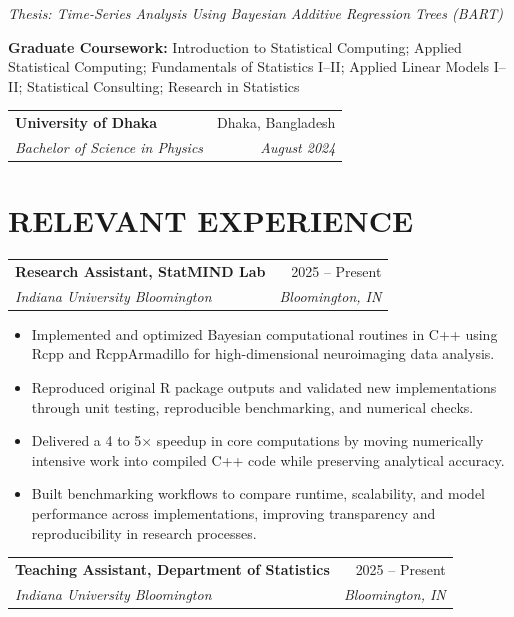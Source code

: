 \documentclass[10pt,letterpaper]{article}
\makeatletter
\newcommand{\resumeEntry}[4]{%
  \begin{tabularx}{\textwidth}{@{}Xr@{}}
    \textbf{#1} & #2 \\
    \textit{#3} & \textit{#4}
  \end{tabularx}%
}
\newenvironment{resumeItems}{%
  \begin{itemize}[
    label=\textbullet,
    leftmargin=14pt,
    labelsep=5pt,
    itemsep=0.5pt,
    topsep=1.0pt,
    parsep=0pt,
    partopsep=0pt
  ]
}{%
  \end{itemize}
}
\makeatother
\begin{document}
\textit{Thesis: Time-Series Analysis Using Bayesian Additive Regression Trees (BART)}

\vspace{0.5pt}

\textbf{Graduate Coursework:}
Introduction to Statistical Computing; Applied Statistical Computing;
Fundamentals of Statistics I--II; Applied Linear Models I--II;
Statistical Consulting; Research in Statistics

\vspace{2.2pt}

\resumeEntry
  {University of Dhaka}
  {Dhaka, Bangladesh}
  {Bachelor of Science in Physics}
  {August 2024}

\section*{RELEVANT EXPERIENCE}

\resumeEntry
  {Research Assistant, StatMIND Lab}
  {2025 -- Present}
  {Indiana University Bloomington}
  {Bloomington, IN}

\begin{resumeItems}
  \item Implemented and optimized Bayesian computational routines in C++ using Rcpp and RcppArmadillo for high-dimensional neuroimaging data analysis.

  \item Reproduced original R package outputs and validated new implementations through unit testing, reproducible benchmarking, and numerical checks.

  \item Delivered a 4 to 5$\times$ speedup in core computations by moving numerically intensive work into compiled C++ code while preserving analytical accuracy.

  \item Built benchmarking workflows to compare runtime, scalability, and model performance across implementations, improving transparency and reproducibility in research processes.
\end{resumeItems}

\vspace{1.3pt}

\resumeEntry
  {Teaching Assistant, Department of Statistics}
  {2025 -- Present}
  {Indiana University Bloomington}
  {Bloomington, IN}
\end{document}
